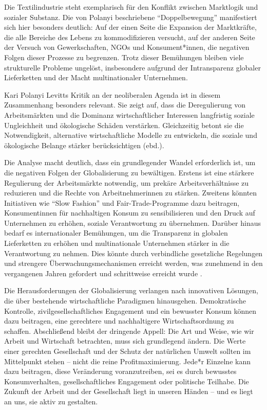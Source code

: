 \documentclass[12pt]{article}
\begin{document}
Die Textilindustrie steht exemplarisch für den Konflikt zwischen Marktlogik und sozialer Substanz. Die von Polanyi beschriebene \enquote{Doppelbewegung} manifestiert sich hier besonders deutlich: Auf der einen Seite die Expansion der Marktkräfte, die alle Bereiche des Lebens zu kommodifizieren versucht, auf der anderen Seite der Versuch von Gewerkschaften, NGOs und Konsument*innen, die negativen Folgen dieser Prozesse zu begrenzen. Trotz dieser Bemühungen bleiben viele strukturelle Probleme ungelöst, insbesondere aufgrund der Intransparenz globaler Lieferketten und der Macht multinationaler Unternehmen.

Kari Polanyi Levitts Kritik an der neoliberalen Agenda ist in diesem Zusammenhang besonders relevant. Sie zeigt auf, dass die Deregulierung von Arbeitsmärkten und die Dominanz wirtschaftlicher Interessen langfristig soziale Ungleichheit und ökologische Schäden verstärken. Gleichzeitig betont sie die Notwendigkeit, alternative wirtschaftliche Modelle zu entwickeln, die soziale und ökologische Belange stärker berücksichtigen (ebd.).

Die Analyse macht deutlich, dass ein grundlegender Wandel erforderlich ist, um die negativen Folgen der Globalisierung zu bewältigen. Erstens ist eine stärkere Regulierung der Arbeitsmärkte notwendig, um prekäre Arbeitsverhältnisse zu reduzieren und die Rechte von Arbeitnehmerinnen zu stärken. Zweitens könnten Initiativen wie \enquote{Slow Fashion} und Fair-Trade-Programme dazu beitragen, Konsumentinnen für nachhaltigen Konsum zu sensibilisieren und den Druck auf Unternehmen zu erhöhen, soziale Verantwortung zu übernehmen.
Darüber hinaus bedarf es internationaler Bemühungen, um die Transparenz in globalen Lieferketten zu erhöhen und multinationale Unternehmen stärker in die Verantwortung zu nehmen. Dies könnte durch verbindliche gesetzliche Regelungen und strengere Überwachungsmechanismen erreicht werden, was zunehmend in den vergangenen Jahren gefordert und schrittweise erreicht wurde \autocite[vgl.][]{nina_kegel_slow_nodate}.

Die Herausforderungen der Globalisierung verlangen nach innovativen Lösungen, die über bestehende wirtschaftliche Paradigmen hinausgehen. Demokratische Kontrolle, zivilgesellschaftliches Engagement und ein bewusster Konsum können dazu beitragen, eine gerechtere und nachhaltigere Wirtschaftsordnung zu schaffen. Abschließend bleibt der dringende Appell: Die Art und Weise, wie wir Arbeit und Wirtschaft betrachten, muss sich grundlegend ändern. Die Werte einer gerechten Gesellschaft und der Schutz der natürlichen Umwelt sollten im Mittelpunkt stehen – nicht die reine Profitmaximierung. Jede*r Einzelne kann dazu beitragen, diese Veränderung voranzutreiben, sei es durch bewusstes Konsumverhalten, gesellschaftliches Engagement oder politische Teilhabe. Die Zukunft der Arbeit und der Gesellschaft liegt in unseren Händen – und es liegt an uns, sie aktiv zu gestalten.
\end{document}
